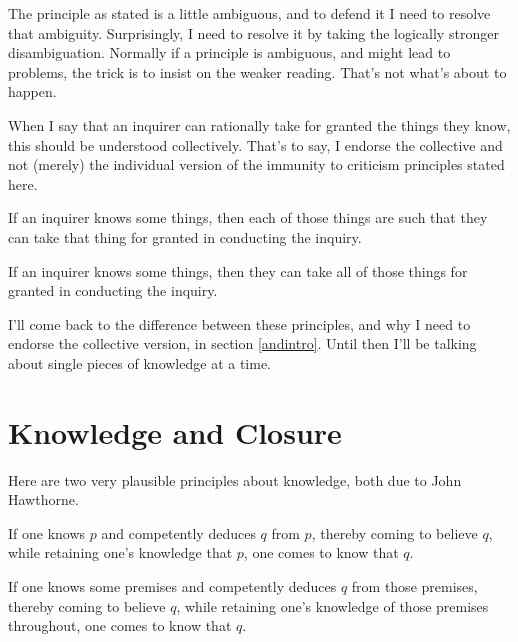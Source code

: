 \documentclass[11pt,]{book}
\providecommand{\tightlist}{%
  \setlength{\itemsep}{0pt}\setlength{\parskip}{0pt}}
\begin{document}
The principle as stated is a little ambiguous, and to defend it I need to resolve that ambiguity. Surprisingly, I need to resolve it by taking the logically stronger disambiguation. Normally if a principle is ambiguous, and might lead to problems, the trick is to insist on the weaker reading. That's not what's about to happen.

When I say that an inquirer can rationally take for granted the things they know, this should be understood collectively. That's to say, I endorse the collective and not (merely) the individual version of the immunity to criticism principles stated here.

\begin{description}
\tightlist
\item[Take for Granted (Individual)]
If an inquirer knows some things, then each of those things are such that they can take that thing for granted in conducting the inquiry.
\item[Take for Granted (Collective)]
If an inquirer knows some things, then they can take all of those things for granted in conducting the inquiry.
\end{description}

I'll come back to the difference between these principles, and why I need to endorse the collective version, in section \ref{andintro}. Until then I'll be talking about single pieces of knowledge at a time.

\hypertarget{knowledge-and-closure}{%
\section{Knowledge and Closure}\label{knowledge-and-closure}}

Here are two very plausible principles about knowledge, both due to John Hawthorne.

\begin{description}
\tightlist
\item[Single Premise Closure]
If one knows \(p\) and competently deduces \(q\) from \(p\), thereby coming to believe \(q\), while retaining one's knowledge that \(p\), one comes to know that \(q\). \citep[43]{Hawthorne2005}
\item[Multiple Premise Closure]
If one knows some premises and competently deduces \(q\) from those premises, thereby coming to believe \(q\), while retaining one's knowledge of those premises throughout, one comes to know that \(q\). \citep[43]{Hawthorne2005}
\end{description}
\end{document}
